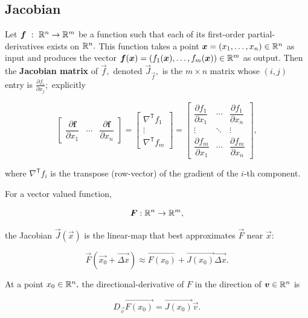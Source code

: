 \documentclass{article}
\begin{document}
\subsection{Jacobian}

\begin{definition}
Let $\boldsymbol{f} ~ : ~ \mathbb{R}^n \to \mathbb{R}^m$ be a \@{function} such that each of its first-order \@{partial-derivatives} exists on $\mathbb{R}^n.$ This \@{function} takes a point $\boldsymbol{x} = (x_1, \dots, x_n) \in \mathbb{R}^n$ as input and produces the \@{vector} $\boldsymbol{f}(\boldsymbol{x}) = (f_1(\boldsymbol{x}), \dots, f_m(\boldsymbol{x})) \in \mathbb{R}^m$ as output. Then the \textbf{Jacobian matrix} of $\vec{f},$ denoted $\vec{J}_{\vec{f}},$ is the $m \times n$ \@{matrix} whose $(i,j)$ \@{entry} is $\frac{\partial f_i}{\partial x_j};$ explicitly

\[ \begin{bmatrix} \dfrac{\partial \mathbf{f}}{\partial x_1} & \cdots & \dfrac{\partial \mathbf{f}}{\partial x_n}
\end{bmatrix}
= \begin{bmatrix}
  \nabla^{\mathsf{T}} f_1 \\  
  \vdots \\
  \nabla^{\mathsf{T}} f_m   
\end{bmatrix}
= \begin{bmatrix}
    \dfrac{\partial f_1}{\partial x_1} & \cdots & \dfrac{\partial f_1}{\partial x_n}\\
    \vdots                             & \ddots & \vdots\\
    \dfrac{\partial f_m}{\partial x_1} & \cdots & \dfrac{\partial f_m}{\partial x_n}
\end{bmatrix}, \]

where $\nabla^{\mathsf{T}} f_i$ is the \@{transpose} (\@{row-vector}) of the \@{gradient} of the $i$-th \@{component}.
\end{definition}

\begin{remark}
For a \@{vector} valued \@{function},

\[ \boldsymbol{F} : \mathbb{R}^n \to \mathbb{R}^m, \]

the \@{Jacobian} $\vec{J}(\vec{x})$ is the \@{linear-map} that best \@{approximates} $\vec{F}$ near $\vec{x}:$

\[ \vec{F}(\vec{x_0} + \vec{\Delta x}) \approx \vec{F(x_0)} + \vec{J(x_0)} \vec{\Delta x}. \]

At a point $x_0 \in \mathbb{R}^n,$ the \@{directional-derivative} of $F$ in the \@{direction} of $\boldsymbol{v} \in \mathbb{R}^n$ is

\[ D_{\vec{v}} \vec{F(x_0)} = \vec{J(x_0)} \vec{v}. \]
\end{remark}
\end{document}
